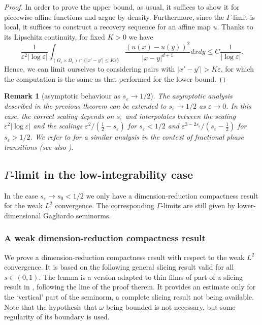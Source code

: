 \documentclass[11pt]{article}
\newtheorem{remark}[definition]{Remark}
\def\e{\varepsilon}
\begin{document}
\begin{proof}
\smallskip
In order to prove the upper bound, as usual, it suffices to show it for piecewise-affine functions and argue by density. Furthermore, since the $\Gamma$-limit is local, it suffices to construct a recovery sequence for an affine map $u$. Thanks to its Lipschitz continuity, for fixed $K>0$ we have
$$
\frac{1}{\e^{2}|\log\e|}\int_{(\Omega_\e\times\Omega_\e)\cap\{|x'-y'|\le K\e\}
}\frac{(u(x)-u(y))^2}{|x-y|^{d+1}}dx dy
\le C\frac1{|\log\e|}.
$$
Hence, we can limit ourselves to considering pairs with $|x'-y'|> K\e$, for which the computation is the same as that performed for the lower bound.
\end{proof}

\begin{remark}[asymptotic behaviour as $s_\e\to1/2$]\rm The asymptotic analysis described in the previous theorem can be extended to $s_\e\to 1/2$ as $\e\to 0$. In this case, the correct scaling depends on $s_\e$ and interpolates between the scaling $\e^2|\log\e|$ and the scalings $\e^2/(\frac12-s_\e)$ for $s_\e< 1/2$ and $\e^{3-2s_\e}/(s_\e-\frac12)$ for $s_\e>1/2$. We refer to \cite{Picerni} for a similar analysis in the context of fractional phase transitions (see also \cite{SV,Solci}).  
\end{remark}



\subsection{$\Gamma$-limit in the low-integrability case}
In the case $s_\e\to s_0<1/2$ we only have a dimension-reduction compactness result for the weak $L^2$ convergence. The corresponding $\Gamma$-limits are still given by lower-dimensional Gagliardo seminorms.

\subsubsection{A weak dimension-reduction compactness result}

We prove a dimension-reduction compactness result with respect to the weak $L^2$ convergence. It is based on the following general slicing result valid for all $s\in(0,1)$. The lemma is a version adapted to thin films of part of a slicing result in \cite[Lemma 6.35]{leofrac}, following the line of the proof therein. It provides an estimate only for the `vertical' part of the seminorm, a complete slicing result not being available. Note that the hypothesis that $\omega$ being bounded is not necessary, but some regularity of its boundary is used.
\end{document}
